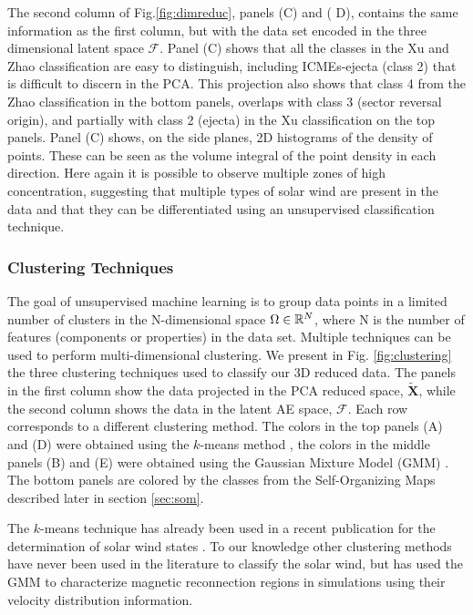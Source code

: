 \documentclass[utf8]{frontiersSCNS} %
\begin{document}
The second column of Fig.\ref{fig:dimreduc}, panels (C) and (
D), contains the same information as the first column, but with the data set encoded in the three dimensional latent space $\boldsymbol{\mathcal{F}}$. Panel (C) shows that all the classes in the Xu and Zhao classification are easy to distinguish, including ICMEs-ejecta (class 2) that is difficult to discern in the PCA. This projection also shows that class 4 from the Zhao classification in the bottom panels, overlaps with class 3 (sector reversal origin), and partially with class 2 (ejecta) in the Xu classification on the top panels. Panel (C) shows, on the side planes, 2D histograms of the density of points. These can be seen as the volume integral of the point density in each direction. Here again it is possible to observe multiple zones of high concentration, suggesting that multiple types of solar wind are present in the data and that they can be differentiated using an unsupervised classification technique. 

\subsubsection{Clustering Techniques}
\label{sec:clustering}
The goal of unsupervised machine learning is to group data points in a limited number of clusters in the N-dimensional space $\Omega\in\Bbb R^N$, where N is the number of features (components or properties) in the data set. Multiple techniques can be used to perform multi-dimensional clustering. We present in Fig. \ref{fig:clustering} the three clustering techniques used to classify our 3D reduced data. The panels in the first column show the data projected in the PCA reduced space, $\boldsymbol{\tilde{X}}$, while the second column shows the data in the latent AE space, $\boldsymbol{\mathcal{F}}$. Each row corresponds to a different clustering method. The colors in the top panels (A) and (D) were obtained using the $k$-means method \citep{1056489}, the colors in the middle panels (B) and (E) were obtained using the Gaussian Mixture Model (GMM) \citep{bishop2006machine}. The bottom panels are colored by the classes from the Self-Organizing Maps described later in section \ref{sec:som}.

The $k$-means technique has already been used in a recent publication for the determination of solar wind states \citep{Roberts2020}. To our knowledge other clustering methods have never been used in the literature to classify the solar wind, but \citep{Dupuis2020} has used the GMM to characterize magnetic reconnection regions in simulations using their velocity distribution information.
\end{document}

